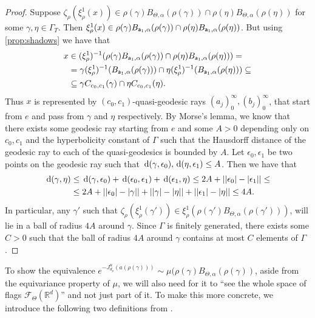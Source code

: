 \documentclass{report}
\begin{document}
\begin{proof}
Suppose $\zeta_\rho(\xi^1_\rho(x)) \in \rho(\gamma) B_{\Theta, \alpha}(\rho(\gamma)) \cap \rho(\eta) B_{\Theta, \alpha}(\rho(\eta))$ for some $\gamma, \eta \in \Gamma_T$.
Then $\xi_\rho^1(x) \in \rho(\gamma) B_{{\sf a}_1, \alpha}(\rho(\gamma)) \cap \rho(\eta) B_{{\sf a}_1, \alpha}(\rho(\eta))$.
But using \cref{prop:shadows} we have that
\begin{align*}
    x &\in (\xi_\rho^1)^{-1}(\rho(\gamma) B_{{\sf a}_1, \alpha}(\rho(\gamma)) \cap \rho(\eta) B_{{\sf a}_1, \alpha}(\rho(\eta))) =\\
    &= \gamma(\xi_\rho^1)^{-1}(B_{{\sf a}_1, \alpha}(\rho(\gamma))) \cap \eta (\xi_\rho^1)^{-1}(B_{{\sf a}_1, \alpha}(\rho(\eta))) \subseteq\\
    &\subseteq \gamma C_{c_0, c_1}(\gamma) \cap \eta C_{c_0, c_1}(\eta).
\end{align*}
Thus $x$ is represented by $(c_0, c_1)$-quasi-geodesic rays $(a_j)_0^\infty, (b_j)_0^\infty $, that start from $e$ and pass from $\gamma$ and $\eta$ respectively.
By Morse's lemma, we know that there exists some geodesic ray starting from $e$ and some $A > 0$ depending only on $c_0, c_1$ and the hyperbolicity constant of $\Gamma$ such that the Hausdorff distance of the geodesic ray to each of the quasi-geodesics is bounded by $A$. 
Let $\epsilon_0, \epsilon_1$ be two points on the geodesic ray such that $\,\mathrm{d}(\gamma, \epsilon_0), \,\mathrm{d}(\eta, \epsilon_1) \leq A$.
Then we have that
\begin{align*}
    \,\mathrm{d}(\gamma, \eta) &\leq \,\mathrm{d}(\gamma, \epsilon_0) + \,\mathrm{d}(\epsilon_0, \epsilon_1) + \,\mathrm{d}(\epsilon_1, \eta) \leq 
    2A + | |\epsilon_0| - |\epsilon_1|| \leq\\
    &\leq
    2A + | |\epsilon_0| - |\gamma|| + | |\gamma| - |\eta| | + | |\epsilon_1| - |\eta|| \leq 4A.
\end{align*}
In particular, any $\gamma'$ such that $\zeta_\rho(\xi^1_\rho(\gamma'))  \in \xi_\rho^1(\rho(\gamma') B_{\Theta, \alpha}(\rho(\gamma')))$, will lie in a ball of radius $4A$ around $\gamma$.
Since $\Gamma$ is finitely generated, there exists some $C > 0$ such that the ball of radius $4A$ around $\gamma$ contains at most $C$ elements of $\Gamma$.
\end{proof}

To show the equivalence $e^{-J_{d_\rho}^u(a(\rho(\gamma)))} \sim \mu(\rho(\gamma)B_{\Theta, \alpha}(\rho(\gamma))$, aside from the equivariance property of $\mu$, we will also need for it to ``see the whole space of flags $\mathcal F_\Theta(\mathbb R^d)$'' and not just part of it.
To make this more concrete, we introduce the following two definitions from \cite{pozzetti_anosov_2023}.
\end{document}
